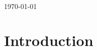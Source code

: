 \newcommand{\givedef}[2]
            {\begin{tabular}{p{1.25cm}p{0.35cm}p{13.75cm}}
                    #1 & {\rm iff} & #2 
             \end{tabular} \\[2mm] }



\newcommand{\Dybdy}[1]{\begin{Definition} \ \\
                       \indent {\rm #1 } \hfill$\Box$ 
                       \end{Definition} }

\newcommand{\support}{This research was supported by the Polish
Research Committee and by the Norwegian Research Council.}




 

\

\vspace{2cm}

\today 

%


\section{Introduction}

